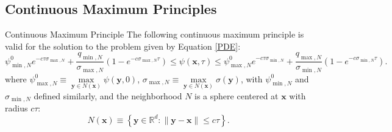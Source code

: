\subsection{Continuous Maximum Principles}
\begin{theorem}[label={cont}]{Continuous Maximum Principle}
   The following continuous maximum principle is valid for the solution to the
   problem given by Equation \eqref{PDE}:
   \begin{equation}
      \psi_{\min,N}^0 e^{-c\tau\sigma_{\max,N}} + 
            \frac{q_{\min,N}}{\sigma_{\max,N}}(1 - e^{-c\sigma_{\max,N}\tau})
      \le\psi(\mathbf{x},\tau)\le
      \psi_{\max,N}^0 e^{-c\tau\sigma_{\min,N}} + 
            \frac{q_{\max,N}}{\sigma_{\min,N}}(1 - e^{-c\sigma_{\min,N}\tau}).
   \end{equation}
   where $\psi_{\max,N}^0\equiv\max\limits_{\mathbf{y}\in N(\mathbf{x})}\psi(\mathbf{y},0)$,
   $\sigma_{\max,N}\equiv\max\limits_{\mathbf{y}\in N(\mathbf{x})}\sigma(\mathbf{y})$, with
   $\psi_{\min,N}^0$ and $\sigma_{\min,N}$ defined similarly, and the neighborhood $N$ is a
   sphere centered at $\mathbf{x}$ with radius $c\tau$:
   \begin{equation}
      N(\mathbf{x})\equiv\left\{\mathbf{y}\in\mathbb{R}^d : 
         \|\mathbf{y} - \mathbf{x}\| \le c\tau\right\}.
   \end{equation}
\end{theorem}

